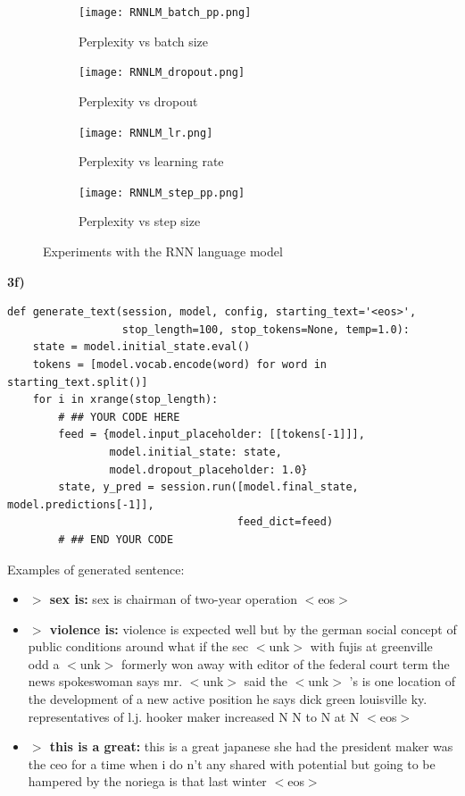 \documentclass{article}
\begin{document}
\begin{figure}[H] 
  \begin{subfigure}[b]{0.5\linewidth}
    \centering
    \texttt{[image: RNNLM\_batch\_pp.png]} 
    \caption{Perplexity vs batch size} 
    \label{rnn_batch} 
    \vspace{4ex}
  \end{subfigure}%
  \begin{subfigure}[b]{0.5\linewidth}
    \centering
    \texttt{[image: RNNLM\_dropout.png]} 
    \caption{Perplexity vs dropout} 
    \label{rnn_dropout} 
    \vspace{4ex}
  \end{subfigure} 
  \begin{subfigure}[b]{0.5\linewidth}
    \centering
    \texttt{[image: RNNLM\_lr.png]} 
    \caption{Perplexity vs learning rate} 
    \label{rnn_lr} 
  \end{subfigure}%
  \begin{subfigure}[b]{0.5\linewidth}
    \centering
    \texttt{[image: RNNLM\_step\_pp.png]} 
    \caption{Perplexity vs step size} 
    \label{rnn_step} 
  \end{subfigure} 
  \caption{Experiments with the RNN language model}
  \label{RNN_e} 
\end{figure}

\textbf{3f)}

\begin{verbatim}
def generate_text(session, model, config, starting_text='<eos>',
                  stop_length=100, stop_tokens=None, temp=1.0):
    state = model.initial_state.eval()
    tokens = [model.vocab.encode(word) for word in starting_text.split()]
    for i in xrange(stop_length):
        # ## YOUR CODE HERE
        feed = {model.input_placeholder: [[tokens[-1]]],
                model.initial_state: state,
                model.dropout_placeholder: 1.0}
        state, y_pred = session.run([model.final_state, model.predictions[-1]],
                                    feed_dict=feed)
        # ## END YOUR CODE
\end{verbatim}
Examples of generated sentence:

\begin{itemize}
\item \textbf{$>$ sex is:} sex is chairman of two-year operation $<$eos$>$

\item \textbf{$>$ violence is:} violence is expected well but by the german social concept of public conditions around what if the sec $<$unk$>$ with fujis at greenville odd a $<$unk$>$ formerly won away with editor of the federal court term the news spokeswoman says mr. $<$unk$>$ said the $<$unk$>$ 's is one location of the development of a new active position he says dick green louisville ky. representatives of l.j. hooker maker increased N N to N at N $<$eos$>$

\item \textbf{$>$ this is a great:} this is a great japanese she had the president maker was the ceo for a time when i do n't any shared with potential but going to be hampered by the noriega is that last winter $<$eos$>$
\end{itemize}
\end{document}
